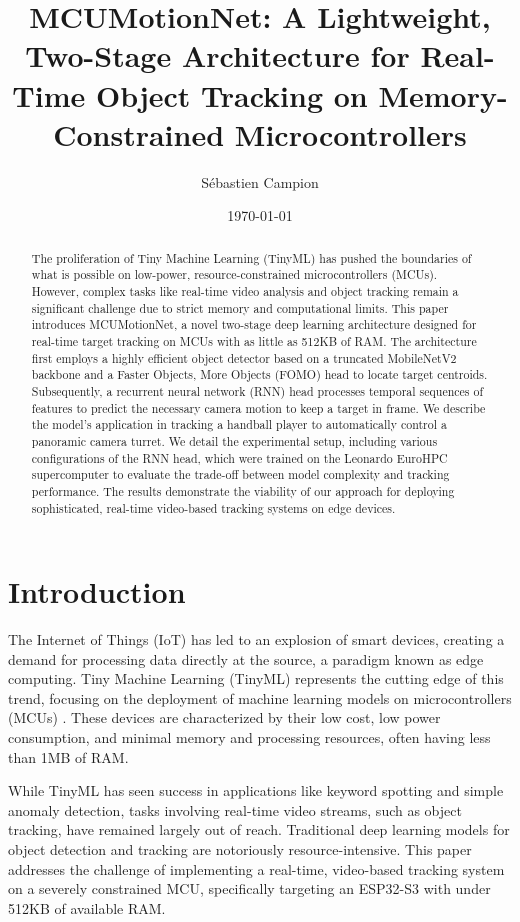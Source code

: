\documentclass{article}
\title{MCUMotionNet: A Lightweight, Two-Stage Architecture for Real-Time Object Tracking on Memory-Constrained Microcontrollers}
\author{Sébastien Campion}
\date{\today}
\begin{document}
\maketitle

\begin{abstract}
The proliferation of Tiny Machine Learning (TinyML) has pushed the boundaries of what is possible on low-power, resource-constrained microcontrollers (MCUs). However, complex tasks like real-time video analysis and object tracking remain a significant challenge due to strict memory and computational limits. This paper introduces MCUMotionNet, a novel two-stage deep learning architecture designed for real-time target tracking on MCUs with as little as 512KB of RAM. The architecture first employs a highly efficient object detector based on a truncated MobileNetV2 backbone and a Faster Objects, More Objects (FOMO) head to locate target centroids. Subsequently, a recurrent neural network (RNN) head processes temporal sequences of features to predict the necessary camera motion to keep a target in frame. We describe the model's application in tracking a handball player to automatically control a panoramic camera turret. We detail the experimental setup, including various configurations of the RNN head, which were trained on the Leonardo EuroHPC supercomputer to evaluate the trade-off between model complexity and tracking performance. The results demonstrate the viability of our approach for deploying sophisticated, real-time video-based tracking systems on edge devices.
\end{abstract}

\section{Introduction}
The Internet of Things (IoT) has led to an explosion of smart devices, creating a demand for processing data directly at the source, a paradigm known as edge computing. Tiny Machine Learning (TinyML) represents the cutting edge of this trend, focusing on the deployment of machine learning models on microcontrollers (MCUs) \cite{tinyml_survey_2}. These devices are characterized by their low cost, low power consumption, and minimal memory and processing resources, often having less than 1MB of RAM.

While TinyML has seen success in applications like keyword spotting and simple anomaly detection, tasks involving real-time video streams, such as object tracking, have remained largely out of reach. Traditional deep learning models for object detection and tracking are notoriously resource-intensive. This paper addresses the challenge of implementing a real-time, video-based tracking system on a severely constrained MCU, specifically targeting an ESP32-S3 with under 512KB of available RAM.
\end{document}
